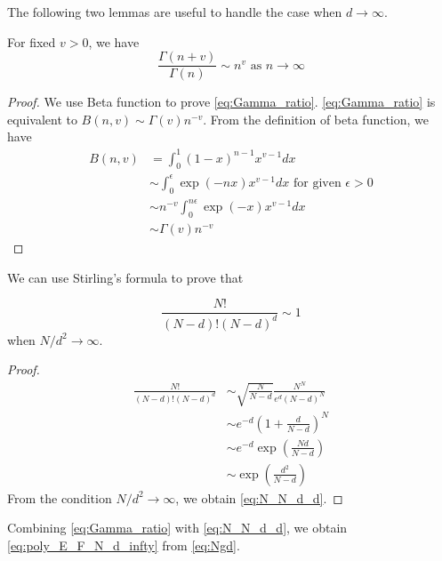 \documentclass{aptpub}
\begin{document}
The following two lemmas are useful to handle the case when $d\to \infty$.
\begin{lemma}\label{lem:Gamma_ratio}
     For fixed $v>0$, we have
     \begin{equation}\label{eq:Gamma_ratio}
         \frac{\Gamma(n+v)}{\Gamma(n)} \sim
         n^v
         \textrm{ as } n \to \infty             
     \end{equation}
 \end{lemma}
 \begin{proof}
     We use Beta function to prove \eqref{eq:Gamma_ratio}.
     \eqref{eq:Gamma_ratio} is equivalent to
     $B(n, v) \sim \Gamma(v) n^{-v}$.
     From the definition of beta function,
     we have
     \begin{align*}
         B(n,v) &=\int_0^1 (1-x)^{n-1} x^{v-1} dx \\
         &\sim \int_0^{\epsilon} \exp(-nx) x^{v-1}dx \textrm{ for given } \epsilon>0\\
         & \sim n^{-v} \int_0^{n\epsilon} \exp(-x)x^{v-1}dx\\
         &\sim \Gamma(v) n^{-v}
     \end{align*}
 \end{proof}
We can use Stirling's formula to prove that
\begin{lemma}
\begin{equation}\label{eq:N_N_d_d}
     \frac{N!}{(N-d)! (N-d)^d} \sim 1
\end{equation}
when $N/d^2 \to \infty$.
\end{lemma}
\begin{proof}
     \begin{align*}
          \frac{N!}{(N-d)! (N-d)^d}
          &\sim \sqrt{\frac{N}{N-d}}\frac{N^N}{ e^d (N-d)^{N}}\\
          &\sim e^{-d} (1+\frac{d}{N-d})^{N} \\
          &\sim e^{-d} \exp(\frac{Nd}{N-d}) \\
          & \sim \exp(\frac{d^2}{N-d})
     \end{align*}
From the condition $N/d^2 \to \infty$,
we obtain \eqref{eq:N_N_d_d}.
\end{proof}
Combining \eqref{eq:Gamma_ratio} with \eqref{eq:N_N_d_d}, we obtain \eqref{eq:poly_E_F_N_d_infty}
from \eqref{eq:Ngd}.
\end{document}
